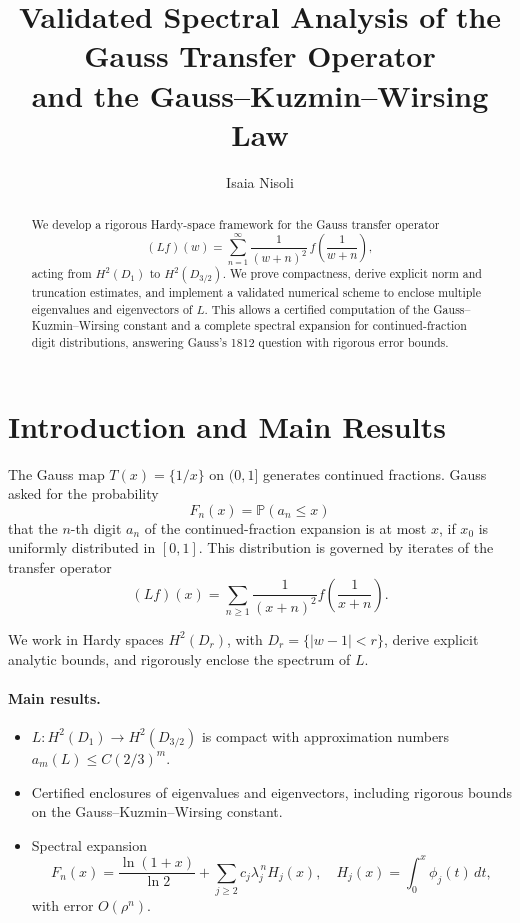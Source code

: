 \documentclass[11pt]{article}
\title{\textbf{Validated Spectral Analysis of the Gauss Transfer Operator\\
and the Gauss--Kuzmin--Wirsing Law}}
\author{Isaia Nisoli}
\date{}
\begin{document}
\maketitle

\begin{abstract}
We develop a rigorous Hardy-space framework for the Gauss transfer operator
\[
(L f)(w)=\sum_{n=1}^{\infty}\frac{1}{(w+n)^2}\,f\!\left(\frac{1}{w+n}\right),
\]
acting from \(H^2(D_1)\) to \(H^2(D_{3/2})\).
We prove compactness, derive explicit norm and truncation estimates,
and implement a validated numerical scheme to enclose multiple eigenvalues
and eigenvectors of \(L\).
This allows a certified computation of the Gauss--Kuzmin--Wirsing constant
and a complete spectral expansion for continued-fraction digit distributions,
answering Gauss's 1812 question with rigorous error bounds.
\end{abstract}

\section{Introduction and Main Results}

The Gauss map \(T(x)=\{1/x\}\) on \((0,1]\) generates continued fractions.
Gauss asked for the probability
\[
F_n(x)=\mathbb P(a_n\le x)
\]
that the \(n\)-th digit \(a_n\) of the continued-fraction expansion is at most \(x\),
if \(x_0\) is uniformly distributed in \([0,1]\).
This distribution is governed by iterates of the transfer operator
\[
(L f)(x)=\sum_{n\ge1}\frac{1}{(x+n)^2}f\!\left(\frac{1}{x+n}\right).
\]

We work in Hardy spaces \(H^2(D_r)\), with \(D_r=\{|w-1|<r\}\),
derive explicit analytic bounds, and rigorously enclose the spectrum of \(L\).

\paragraph{Main results.}
\begin{itemize}
\item \(L:H^2(D_1)\to H^2(D_{3/2})\) is compact with
approximation numbers \(a_m(L)\le C(2/3)^m\).
\item Certified enclosures of eigenvalues and eigenvectors,
including rigorous bounds on the Gauss--Kuzmin--Wirsing constant.
\item Spectral expansion
\[
F_n(x)=\frac{\ln(1+x)}{\ln2}
+\sum_{j\ge2}c_j\lambda_j^{\,n}H_j(x),
\quad H_j(x)=\!\int_0^x\phi_j(t)\,dt,
\]
with error \(O(\rho^n)\).
\end{itemize}
\end{document}

